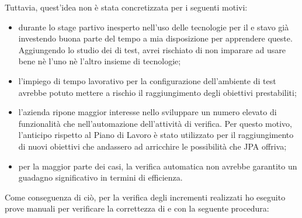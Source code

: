 Tuttavia, quest'idea non è stata concretizzata per i seguenti motivi:

\begin{itemize}
\item durante lo stage partivo inesperto nell'uso delle tecnologie per il
  \FREND{} e stavo già investendo buona parte del tempo a mia disposizione per
  apprendere queste. Aggiungendo lo studio dei  di test, avrei
  rischiato di non imparare ad usare bene nè l'uno nè l'altro insieme di
  tecnologie;
\item l'impiego di tempo lavorativo per la configurazione dell'ambiente di
  test avrebbe potuto mettere a rischio il raggiungimento degli obiettivi
  prestabiliti;
\item l'azienda ripone maggior interesse nello sviluppare un numero elevato di
  funzionalità che nell'automazione dell'attività di verifica. Per questo
  motivo, l'anticipo rispetto al Piano di Lavoro è stato utilizzato per il
  raggiungimento di nuovi obiettivi che andassero ad arricchire le possibilità
  che JPA offriva;
\item per la maggior parte dei casi, la verifica automatica non avrebbe
  garantito un guadagno significativo in termini di efficienza.
\end{itemize}

Come conseguenza di ciò, per la verifica degli incrementi realizzati ho
eseguito prove manuali per verificare la correttezza di \BKEND{} e \FREND{}
con la seguente procedura:

